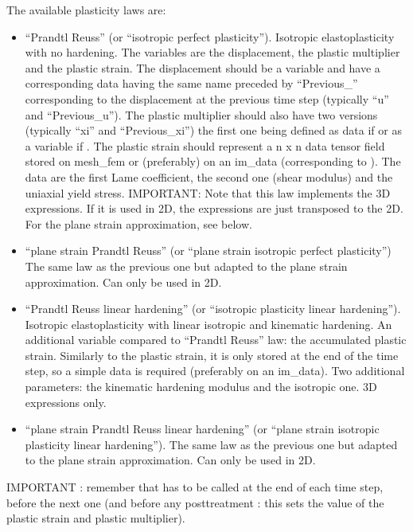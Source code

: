 \documentclass[a4paper,11pt,english]{sphinxmanual}
\begin{document}
The available plasticity laws are:
\begin{itemize}
\item {} 
“Prandtl Reuss” (or “isotropic perfect plasticity”).
Isotropic elasto\sphinxhyphen{}plasticity with no hardening. The variables are the
displacement, the plastic multiplier and the plastic strain.
The displacement should be a variable and have a corresponding data
having the same name preceded by “Previous\_” corresponding to the
displacement at the previous time step (typically “u” and “Previous\_u”).
The plastic multiplier should also have two versions (typically “xi”
and “Previous\_xi”) the first one being defined as data if
 or as a variable if
.
The plastic strain should represent a n x n data tensor field stored
on mesh\_fem or (preferably) on an im\_data (corresponding to ).
The data are the first Lame coefficient, the second one (shear modulus)
and the uniaxial yield stress. IMPORTANT: Note that this law implements
the 3D expressions. If it is used in 2D, the expressions are just
transposed to the 2D. For the plane strain approximation, see below.

\item {} 
“plane strain Prandtl Reuss”
(or “plane strain isotropic perfect plasticity”)
The same law as the previous one but adapted to the plane strain
approximation. Can only be used in 2D.

\item {} 
“Prandtl Reuss linear hardening”
(or “isotropic plasticity linear hardening”).
Isotropic elasto\sphinxhyphen{}plasticity with linear isotropic and kinematic
hardening. An additional variable compared to “Prandtl Reuss” law:
the accumulated plastic strain. Similarly to the plastic strain, it
is only stored at the end of the time step, so a simple data is
required (preferably on an im\_data).
Two additional parameters: the kinematic hardening modulus and the
isotropic one. 3D expressions only.

\item {} 
“plane strain Prandtl Reuss linear hardening”
(or “plane strain isotropic plasticity linear hardening”).
The same law as the previous one but adapted to the plane strain
approximation. Can only be used in 2D.

\end{itemize}

IMPORTANT : remember that  has
to be called at the end of each time step, before the next one
(and before any post\sphinxhyphen{}treatment : this sets the value of the plastic
strain and plastic multiplier).
\end{document}
